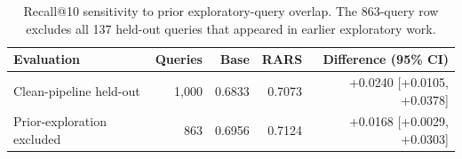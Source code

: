 \begin{table}[t]
\centering
\caption{Recall@10 sensitivity to prior exploratory-query overlap. The 863-query row excludes all 137 held-out queries that appeared in earlier exploratory work.}
\label{tab:rars-overlap-sensitivity}
\begin{tabular}{lrrrr}
\toprule
Evaluation & Queries & Base & RARS & Difference (95\% CI) \\
\midrule
Clean-pipeline held-out & 1,000 & 0.6833 & 0.7073 & +0.0240 [{+0.0105}, {+0.0378}] \\
Prior-exploration excluded & 863 & 0.6956 & 0.7124 & +0.0168 [{+0.0029}, {+0.0303}] \\
\bottomrule
\end{tabular}
\end{table}
